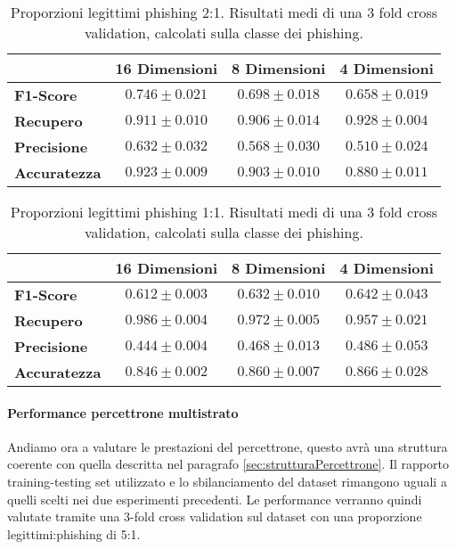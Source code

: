 \documentclass[../../main.tex]{subfiles}
\begin{document}
    \begin{table}[H]
        \centering
        \begin{tabular}{lccc}
            \toprule
            {} &                      \textbf{16 Dimensioni} & \textbf{8 Dimensioni} & \textbf{4 Dimensioni} \\
            \midrule
            \textbf{F1-Score }      &      $0.746 \pm 0.021$ & $0.698 \pm 0.018$ & $0.658 \pm 0.019$\\
            \textbf{Recupero   }    &      $0.911 \pm 0.010$ & $0.906 \pm 0.014$ & $0.928 \pm 0.004$\\
            \textbf{Precisione}     &      $0.632 \pm 0.032$ & $0.568 \pm 0.030$ & $0.510 \pm 0.024$\\
            \textbf{Accuratezza }   &      $0.923 \pm 0.009$ & $0.903 \pm 0.010$ & $0.880 \pm 0.011$\\
            \bottomrule
        \end{tabular}     
        \caption{Proporzioni legittimi phishing 2:1. Risultati medi di una 3 fold cross validation, calcolati sulla classe dei phishing.} 
        \label{tab:2a1Undersampling}  
    \end{table}

    \begin{table}[H]
        \centering
        \begin{tabular}{lccc}
            \toprule
            {} &                      \textbf{16 Dimensioni} & \textbf{8 Dimensioni} & \textbf{4 Dimensioni} \\
            \midrule
            \textbf{F1-Score }      &      $0.612 \pm 0.003$ & $0.632 \pm 0.010$ & $0.642 \pm 0.043$\\
            \textbf{Recupero   }    &      $0.986 \pm 0.004$ & $0.972 \pm 0.005$ & $0.957 \pm 0.021$\\
            \textbf{Precisione}     &      $0.444 \pm 0.004$ & $0.468 \pm 0.013$ & $0.486 \pm 0.053$\\
            \textbf{Accuratezza }   &      $0.846 \pm 0.002$ & $0.860 \pm 0.007$ & $0.866 \pm 0.028$\\
            \bottomrule
        \end{tabular}     
        \caption{Proporzioni legittimi phishing 1:1. Risultati medi di una 3 fold cross validation, calcolati sulla classe dei phishing.}  
        \label{tab:1a1Undersampling} 
    \end{table}

    \paragraph{Performance percettrone multistrato}
    Andiamo ora a valutare le prestazioni del percettrone, questo avrà una struttura coerente con quella descritta nel paragrafo \ref{sec:strutturaPercettrone}. Il rapporto training-testing set utilizzato e lo sbilanciamento del dataset rimangono uguali a quelli scelti nei due esperimenti precedenti. Le performance verranno quindi valutate tramite una 3-fold cross validation sul dataset con una proporzione legittimi:phishing di 5:1.
\end{document}

